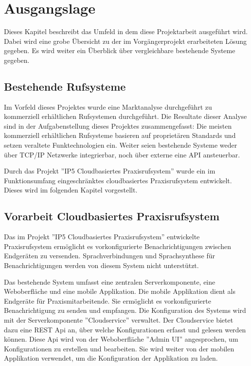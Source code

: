 \section{Ausgangslage}

Dieses Kapitel beschreibt das Umfeld in dem diese Projektarbeit ausgeführt wird.
Dabei wird eine grobe Übersicht zu der im Vorgängerprojekt erarbeiteten Lösung gegeben.
Es wird weiter ein Überblick über vergleichbare bestehende Systeme gegeben.

\subsection{Bestehende Rufsysteme}

Im Vorfeld dieses Projektes wurde eine Marktanalyse durchgeführt zu kommerziell erhältlichen Rufsystemen durchgeführt.
Die Resultate dieser Analyse sind in der Aufgabenstellung dieses Projektes zusammengefasst:
Die meisten kommerziell erhältlichen Rufsysteme basieren auf proprietären Standards und setzen veraltete Funktechnologien ein.
Weiter seien bestehende Systeme weder über TCP/IP Netzwerke integrierbar, noch über externe eine API ansteuerbar.\cite{aufgabenstellung}

Durch das Projekt ''IP5 Cloudbasiertes Praxisrufsystem'' wurde ein im Funktionsumfang eingeschränktes cloudbasiertes Praxisrufsystem entwickelt.
Dieses wird im folgenden Kapitel vorgestellt.

\subsection{Vorarbeit Cloudbasiertes Praxisrufsystem}

Das im Projekt ''IP5 Cloudbasiertes Praxisrufsystem'' entwickelte Praxisrufsystem ermöglicht es vorkonfigurierte Benachrichtigungen zwischen Endgeräten zu versenden.
Sprachverbindungen und Sprachsynthese für Benachrichtigungen werden von diesem System nicht unterstützt.

Das bestehende System umfasst eine zentralen Serverkomponente, eine Weboberfläche und eine mobile Applikation.
Die mobile Applikation dient als Endgeräte für Praxismitarbeitende.
Sie ermöglicht es vorkonfigurierte Benachrichtigung zu senden und empfangen.
Die Konfiguration des Systems wird mit der Serverkomponente ''Cloudservice'' verwaltet.
Der Cloudservice bietet dazu eine REST Api an, über welche Konfigurationen erfasst und gelesen werden können.
Diese Api wird von der Weboberfläche ''Admin UI'' angesprochen, um Konfigurationen zu erstellen und bearbeiten.
Sie wird weiter von der mobilen Applikation verwendet, um die Konfiguration der Applikation zu laden.

